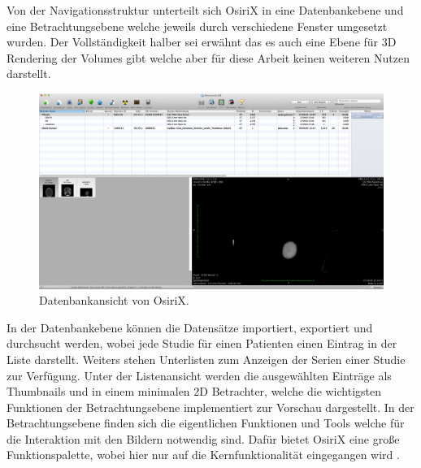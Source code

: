 Von der Navigationsstruktur unterteilt sich OsiriX in eine Datenbankebene und eine Betrachtungsebene welche jeweils durch verschiedene Fenster umgesetzt wurden.
Der Vollständigkeit halber sei erwähnt das es auch eine Ebene für 3D Rendering der Volumes gibt welche aber für diese Arbeit keinen weiteren Nutzen darstellt.
\begin{figure}[t]
	\centering
	\includegraphics[width=0.8\linewidth]{img/c2_osirix_db_view.jpg}
	\caption{Datenbankansicht von OsiriX.}
\end{figure}
In der Datenbankebene können die Datensätze importiert, exportiert und durchsucht werden, wobei jede Studie für einen Patienten einen Eintrag in der Liste darstellt.
Weiters stehen Unterlisten zum Anzeigen der Serien einer Studie zur Verfügung.
Unter der Listenansicht werden die ausgewählten Einträge als Thumbnails und in einem minimalen 2D Betrachter,
welche die wichtigsten Funktionen der Betrachtungsebene implementiert zur Vorschau dargestellt.
In der Betrachtungsebene finden sich die eigentlichen Funktionen und Tools welche für die Interaktion mit den Bildern notwendig sind.
Dafür bietet OsiriX eine große Funktionspalette, wobei hier nur auf die Kernfunktionalität eingegangen wird \cite{osirix}.
